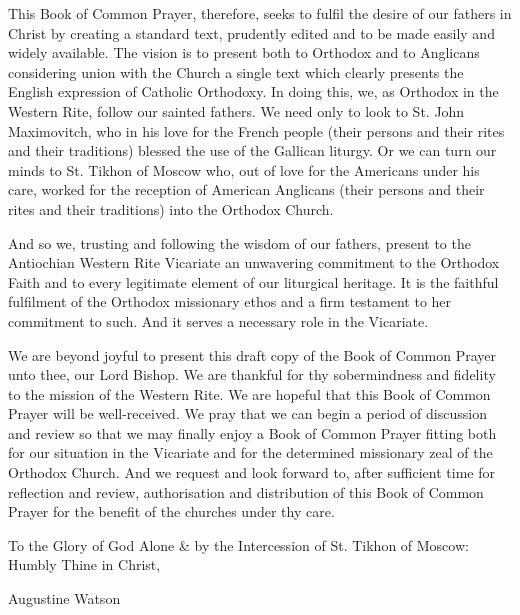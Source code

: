 This Book of Common Prayer, therefore, seeks to fulfil the desire of our fathers in Christ by creating a standard text, prudently edited and to be made easily and widely available. The vision is to present both to Orthodox and to Anglicans considering union with the Church a single text which clearly presents the English expression of Catholic Orthodoxy. In doing this, we, as Orthodox in the Western Rite, follow our sainted fathers. We need only to look to St. John Maximovitch, who in his love for the French people (their persons and their rites and their traditions) blessed the use of the Gallican liturgy. Or we can turn our minds to St. Tikhon of Moscow who, out of love for the Americans under his care, worked for the reception of American Anglicans (their persons and their rites and their traditions) into the Orthodox Church.\par
And so we, trusting and following the wisdom of our fathers, present to the Antiochian Western Rite Vicariate an unwavering commitment to the Orthodox Faith and to every legitimate element of our liturgical heritage. It is the faithful fulfilment of the Orthodox missionary ethos and a firm testament to her commitment to such. And it serves a necessary role in the Vicariate.

\par\noindent
We are beyond joyful to present this draft copy of the Book of Common Prayer unto thee, our Lord Bishop. We are thankful for thy sobermindness and fidelity to the mission of the Western Rite. We are hopeful that this Book of Common Prayer will be well-received. We pray that we can begin a period of discussion and review so that we may finally enjoy a Book of Common Prayer fitting both for our situation in the Vicariate and for the determined missionary zeal of the Orthodox Church. And we request and look forward to, after sufficient time for reflection and review, authorisation and distribution of this Book of Common Prayer for the benefit of the churches under thy care.

\begin{FlushRight}

To the Glory of God Alone \& by the Intercession of St. Tikhon of Moscow: Humbly Thine in Christ,

Augustine Watson
\end{FlushRight}